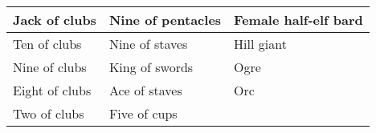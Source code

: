 \begin{longtable}{llllll}
{\begin{minipage}[t]{1.102in}
Jack of clubs\end{minipage}} & \multicolumn{1}{p{1.207in}|}{\begin{minipage}[t]{1.207in}\raggedright
Nine of pentacles\end{minipage}} & \multicolumn{4}{p{2.191in}|}{\begin{minipage}[t]{2.191in}\raggedright
Female half-elf bard\end{minipage}}\\
\hline
\multicolumn{1}{|p{1.102in}|}{\begin{minipage}[t]{1.102in}\raggedright
Ten of clubs\end{minipage}} & \multicolumn{1}{p{1.207in}|}{\begin{minipage}[t]{1.207in}\raggedright
Nine of staves\end{minipage}} & \multicolumn{4}{p{2.191in}|}{\begin{minipage}[t]{2.191in}\raggedright
Hill giant\end{minipage}}\\
\hline
\multicolumn{1}{|p{1.102in}|}{\begin{minipage}[t]{1.102in}\raggedright
Nine of clubs\end{minipage}} & \multicolumn{1}{p{1.207in}|}{\begin{minipage}[t]{1.207in}\raggedright
King of swords\end{minipage}} & \multicolumn{4}{p{2.191in}|}{\begin{minipage}[t]{2.191in}\raggedright
Ogre\end{minipage}}\\
\hline
\multicolumn{1}{|p{1.102in}|}{\begin{minipage}[t]{1.102in}\raggedright
Eight of clubs\end{minipage}} & \multicolumn{1}{p{1.207in}|}{\begin{minipage}[t]{1.207in}\raggedright
Ace of staves\end{minipage}} & \multicolumn{4}{p{2.191in}|}{\begin{minipage}[t]{2.191in}\raggedright
Orc\end{minipage}}\\
\hline
\multicolumn{1}{|p{1.102in}|}{\begin{minipage}[t]{1.102in}\raggedright
Two of clubs\end{minipage}} & \multicolumn{1}{p{1.207in}|}{\begin{minipage}[t]{1.207in}\raggedright
Five of cups\end{minipage}} & \multicolumn{4}{p{2.191in}|}{\begin{minipage}[t]{2.191in}\raggedright

\end{minipage}}
\end{longtable}
